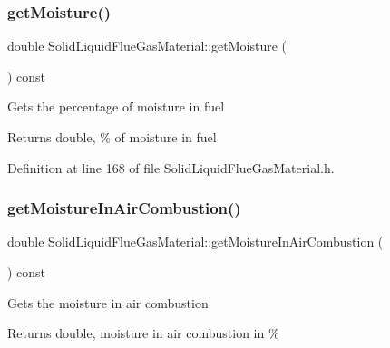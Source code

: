 \mbox{\label{class_solid_liquid_flue_gas_material_accf3c8be942d0ba244f6eabab6e7012b}} 
\subsubsection{\texorpdfstring{get\+Moisture()}{getMoisture()}}
{\footnotesize\ttfamily double Solid\+Liquid\+Flue\+Gas\+Material\+::get\+Moisture (\begin{DoxyParamCaption}{ }\end{DoxyParamCaption}) const\hspace{0.3cm}{\ttfamily [inline]}}

Gets the percentage of moisture in fuel \begin{DoxyReturn}{Returns}
double, \% of moisture in fuel 
\end{DoxyReturn}


Definition at line 168 of file Solid\+Liquid\+Flue\+Gas\+Material.\+h.

\mbox{\label{class_solid_liquid_flue_gas_material_ae3d9780851b8217ed2885753f11ec18b}} 
\subsubsection{\texorpdfstring{get\+Moisture\+In\+Air\+Combustion()}{getMoistureInAirCombustion()}}
{\footnotesize\ttfamily double Solid\+Liquid\+Flue\+Gas\+Material\+::get\+Moisture\+In\+Air\+Combustion (\begin{DoxyParamCaption}{ }\end{DoxyParamCaption}) const\hspace{0.3cm}{\ttfamily [inline]}}

Gets the moisture in air combustion \begin{DoxyReturn}{Returns}
double, moisture in air combustion in \% 
\end{DoxyReturn}


